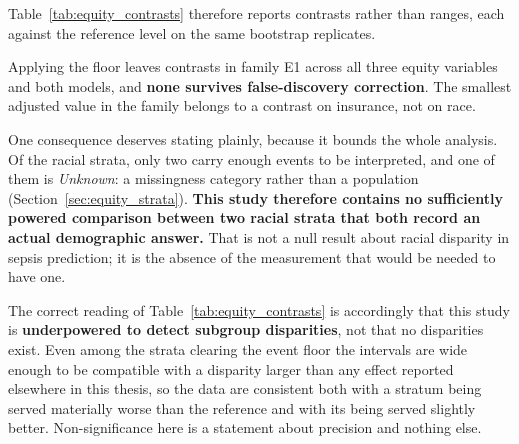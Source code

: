 Table~\ref{tab:equity_contrasts} therefore reports contrasts rather than
ranges, each against the reference level on the same bootstrap replicates.

\begin{table}[H]
    \centering\footnotesize
    \caption{Subgroup AUROC differences against the reference level, for the
    racial strata clearing the \pcMinSubgroupEvents{}-event floor.
    $q_{\text{BH}}$ is the Benjamini--Hochberg adjusted $p$-value over
    exploratory family E1, which contains all \pcEquityNContrastsEOne{} eligible
    subgroup contrasts across race, language and insurance for both models,
    not only those shown here. \textbf{No racial contrast is significant.}
    The reference level is the largest stratum of its own variable and is a
    residual administrative category, not a population
    (Section~\ref{sec:equity_strata}). \textbf{[E] exploratory.}}
    \label{tab:equity_contrasts}
\end{table}

Applying the floor leaves \pcEquityNContrastsEOne{} contrasts in family E1
across all three equity variables and both models, and \textbf{none survives
false-discovery correction}. The smallest adjusted value in the family belongs
to a contrast on insurance, not on race.

One consequence deserves stating plainly, because it bounds the whole analysis.
Of the racial strata, only two carry enough events to be interpreted, and one of
them is \emph{Unknown}: a missingness category rather than a population
(Section~\ref{sec:equity_strata}). \textbf{This study therefore contains no
sufficiently powered comparison between two racial strata that both record an
actual demographic answer.} That is not a null result about racial disparity in
sepsis prediction; it is the absence of the measurement that would be needed to
have one.

The correct reading of Table~\ref{tab:equity_contrasts} is accordingly that this
study is \textbf{underpowered to detect subgroup disparities}, not that no
disparities exist. Even among the strata clearing the event floor the intervals
are wide enough to be compatible with a disparity larger than any effect
reported elsewhere in this thesis, so the data are consistent both with a
stratum being served materially worse than the reference and with its being
served slightly better. Non-significance here is a statement about precision and
nothing else.

